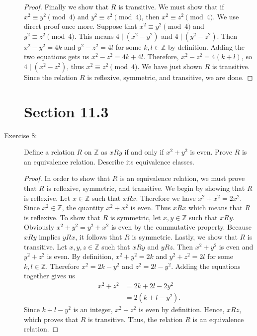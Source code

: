 \documentclass[12pt]{article}
\begin{document}
\begin{description}
\begin{spacing}{2}
\begin{proof}
\newline
Finally we show that $R$ is transitive.  We must show that if $x^2 \equiv y^2 \pmod{4}$ and $y^2 \equiv z^2 \pmod{4}$, then $x^2 \equiv z^2 \pmod{4}$. We use direct proof once more. Suppose that $x^2 \equiv y^2 \pmod{4}$ and $y^2 \equiv z^2 \pmod{4}$. This means $4 \mid (x^2-y^2)$ and $4 \mid (y^2-z^2)$. Then $x^2-y^2 = 4k$ and $y^2 - z^2 = 4l$ for some $k,l \in \mathbb{Z}$ by definition. Adding the two equations gets us $x^2 - z^2 = 4k + 4l$. Therefore, $x^2 - z^2 = 4(k+l)$, so $4 \mid (x^2 - z^2)$, thus $x^2 \equiv z^2 \pmod{4}$. We have just shown $R$ is transitive.
\newline
Since the relation $R$ is reflexive, symmetric, and transitive, we are done.
\end{proof}
\end{spacing} 
\section*{Section 11.3}
\item[Exercise 8:] Define a relation $R$ on $\mathbb{Z}$ as $xRy$ if and only if $x^2+y^2$ is even. Prove $R$ is an equivalence relation. Describe its equivalence classes.
\begin{spacing}{2}
\begin{proof}
In order to show that $R$ is an equivalence relation, we must prove that $R$ is reflexive, symmetric, and transitive.
\newline
We begin by showing that $R$ is reflexive. Let $x \in \mathbb{Z}$ such that $xRx$. Therefore we have $x^2 + x^2 = 2x^2$. Since $x^2 \in \mathbb{Z}$, the quantity $x^2 + x^2$ is even. Thus $xRx$ which means that $R$ is reflexive.
\newline
To show that $R$ is symmetric, let $x,y \in \mathbb{Z}$ such that $xRy$. Obviously $x^2 + y^2 = y^2 + x^2$ is even by the commutative property. Because $xRy$ implies $yRx$, it follows that $R$ is symmetric.
\newline
Lastly, we show that $R$ is transitive. Let $x,y,z \in \mathbb{Z}$ such that $xRy$ and $yRz$. Then $x^2 + y^2$ is even and $y^2 + z^2$ is even. By definition, $x^2 + y^2 = 2k$ and $y^2 + z^2 = 2l$ for some $k,l \in \mathbb{Z}$. Therefore $x^2 = 2k - y^2$ and $z^2 = 2l - y^2$. Adding the equations together gives us
\begin{align*}
    x^2 + z^2 &= 2k + 2l - 2y^2 \\
    &= 2(k + l - y^2).
\end{align*}
Since $k + l - y^2$ is an integer, $x^2 + z^2$ is even by definition. Hence, $xRz$, which proves that $R$ is transitive. Thus, the relation $R$ is an equivalence relation.

\end{proof}
\end{spacing}
\end{description}
\end{document}
